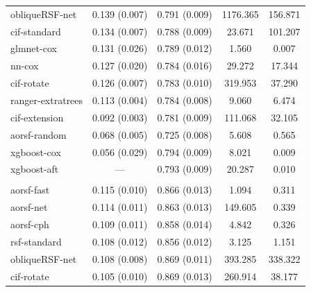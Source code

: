\documentclass{article}\usepackage[]{graphicx}\usepackage[]{xcolor}
\newenvironment{knitrout}{}{} %
\begin{document}
\begin{knitrout}
\begin{longtable}[t]{lcccc}
\hspace{1em}obliqueRSF-net & 0.139 (0.007) & 0.791 (0.009) & 1176.365 & 156.871\\
\hspace{1em}cif-standard & 0.134 (0.007) & 0.788 (0.009) & 23.671 & 101.207\\
\hspace{1em}glmnet-cox & 0.131 (0.026) & 0.789 (0.012) & 1.560 & 0.007\\
\hspace{1em}nn-cox & 0.127 (0.020) & 0.784 (0.016) & 29.272 & 17.344\\
\hspace{1em}cif-rotate & 0.126 (0.007) & 0.783 (0.010) & 319.953 & 37.290\\
\hspace{1em}ranger-extratrees & 0.113 (0.004) & 0.784 (0.008) & 9.060 & 6.474\\
\hspace{1em}cif-extension & 0.092 (0.003) & 0.781 (0.009) & 111.068 & 32.105\\
\hspace{1em}aorsf-random & 0.068 (0.005) & 0.725 (0.008) & 5.608 & 0.565\\
\hspace{1em}xgboost-cox & 0.056 (0.029) & 0.794 (0.009) & 8.021 & 0.009\\
\hspace{1em}xgboost-aft & --- & 0.793 (0.009) & 20.287 & 0.010\\
\addlinespace[0.3em]
\multicolumn{5}{l}{\textit{\textbf{MESA; heart failure, n = 6785, p = 48}}}\\
\hline
\hspace{1em}aorsf-fast & 0.115 (0.010) & 0.866 (0.013) & 1.094 & 0.311\\
\hspace{1em}aorsf-net & 0.114 (0.011) & 0.863 (0.013) & 149.605 & 0.339\\
\hspace{1em}aorsf-cph & 0.109 (0.011) & 0.858 (0.014) & 4.842 & 0.326\\
\hspace{1em}rsf-standard & 0.108 (0.012) & 0.856 (0.012) & 3.125 & 1.151\\
\hspace{1em}obliqueRSF-net & 0.108 (0.008) & 0.869 (0.011) & 393.285 & 338.322\\
\hspace{1em}cif-rotate & 0.105 (0.010) & 0.869 (0.013) & 260.914 & 38.177\\

\end{longtable}
\end{knitrout}
\end{document}
